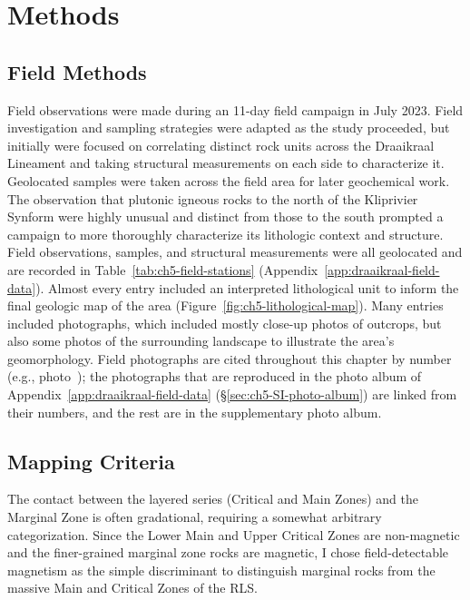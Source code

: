 \section{Methods}
\label{sec:ch5-methods}


\subsection{Field Methods}
\label{sec:ch5-field-methods}
Field observations were made during an 11-day field campaign in July 2023. Field investigation and sampling strategies were
adapted as the study proceeded, but initially were focused on correlating distinct rock units across the Draaikraal Lineament and taking 
structural measurements on each side to characterize it. Geolocated samples were taken across the field area for later geochemical work. 
The observation that plutonic igneous rocks to the north of the Kliprivier Synform were highly unusual and distinct from those to the south
prompted a campaign to more thoroughly characterize its lithologic context and structure. Field observations, samples, and structural measurements
were all geolocated and are recorded in Table~\ref{tab:ch5-field-stations} (Appendix~\ref{app:draaikraal-field-data}). Almost every entry included an interpreted lithological unit to inform
the final geologic map of the area (Figure~\ref{fig:ch5-lithological-map}). Many entries included photographs, which included mostly
close-up photos of outcrops, but also some photos of the surrounding landscape to illustrate the area's geomorphology. Field photographs are cited 
throughout this chapter by number (e.g., photo~); the photographs that
are reproduced in the photo album of Appendix~\ref{app:draaikraal-field-data}
(\S\ref{sec:ch5-SI-photo-album}) are linked from their numbers, and the rest
are in the supplementary photo album. 


\subsection{Mapping Criteria}
\label{sec:ch5-mapping-criteria}

The contact between the layered series (Critical and Main Zones) and the
Marginal Zone is often gradational, requiring a somewhat arbitrary
categorization. Since the Lower Main and Upper Critical Zones are
non-magnetic and the finer-grained marginal zone rocks are magnetic, I chose
field-detectable magnetism as the simple discriminant to distinguish
marginal rocks from the massive Main and Critical Zones of the RLS. 

